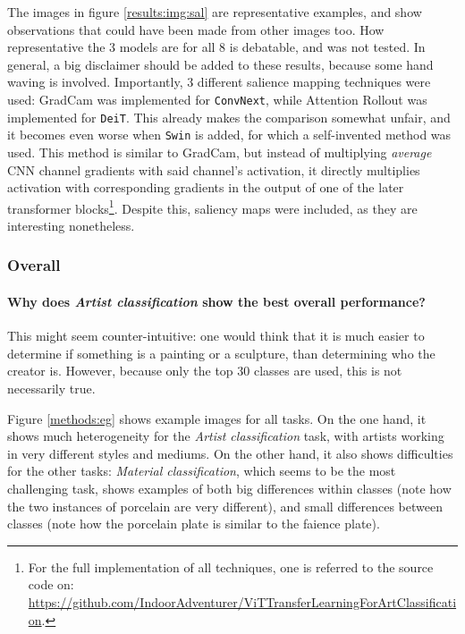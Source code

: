 The images in figure \ref{results:img:sal} are representative examples, and show observations that could have been made from other images too. How representative the 3 models are for all 8 is debatable, and was not tested. In general, a big disclaimer should be added to these results, because some hand waving is involved. Importantly, 3 different salience mapping techniques were used: GradCam \citep{selvaraju2017grad} was implemented for \texttt{ConvNext}, while Attention Rollout \citep{abnar2020quantifying} was implemented for \texttt{DeiT}. This already makes the comparison somewhat unfair, and it becomes even worse when \texttt{Swin} is added, for which a self-invented method was used. This method is similar to GradCam, but instead of multiplying \textit{average} CNN channel gradients with said channel's activation, it directly multiplies activation with corresponding gradients in the output of one of the later transformer blocks\footnote{For the full implementation of all techniques, one is referred to the source code on: \\ \url{https://github.com/IndoorAdventurer/ViTTransferLearningForArtClassification}.}. Despite this, saliency maps were included, as they are interesting nonetheless.

\subsubsection{Overall}

\paragraph{Why does \textit{Artist classification} show the best overall performance?}
This might seem counter-intuitive: one would think that it is much easier to determine if something is a painting or a sculpture, than determining who the creator is. However, because only the top 30 classes are used, this is not necessarily true.

Figure \ref{methods:eg} shows example images for all tasks. On the one hand, it shows much heterogeneity for the \textit{Artist classification} task, with artists working in very different styles and mediums. On the other hand, it also shows difficulties for the other tasks: \textit{Material classification}, which seems to be the most challenging task, shows examples of both big differences within classes (note how the two instances of porcelain are very different), and small differences between classes (note how the porcelain plate is similar to the faience plate).

